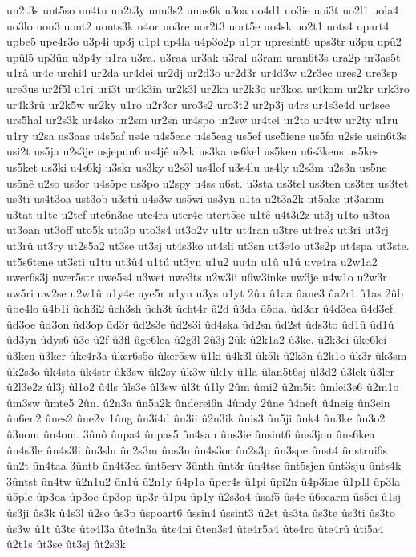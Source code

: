 {un2t3s
unt5so
un4tu
un2t3y
unu3s2
unus6k
u3oa
uo4d1
uo3ie
uoi3t
uo2l1
uola4
uo3lo
uon3
uont2
uonts3k
u4or
uo3re
uor2t3
uort5e
uo4sk
uo2t1
uots4
upart4
upbe5
upe4r3o
u3p4i
up3j
u1pl
up4la
u4p3o2p
u1pr
upresint6
ups3tr
u3pu
upû2
upûl5
up3ûn
u3p4y
u1ra
u3ra.
u3raa
ur3ak
u3ral
u3ram
uran6t3s
ura2p
ur3as5t
u1râ
ur4c
urchi4
ur2da
ur4dei
ur2dj
ur2d3o
ur2d3r
ur4d3w
u2r3ec
ures2
ure3sp
ure3us
ur2f5l
u1ri
uri3t
ur4k3in
ur2k3l
ur2kn
ur2k3o
ur3koa
ur4kom
ur2kr
urk3ro
ur4k3rû
ur2k5w
ur2ky
u1ro
u2r3or
uro3s2
uro3t2
ur2p3j
u4rs
ur4s3e4d
ur4see
urs5hal
ur2s3k
ur4sko
ur2sm
ur2sn
ur4spo
ur2sw
ur4tei
ur2to
ur4tw
ur2ty
u1ru
u1ry
u2sa
us3aas
u4s5af
us4e
u4s5eac
u4s5eag
us5ef
use5iene
us5fa
u2sie
usin6t3s
usi2t
us5ja
u2s3je
usjepun6
us4jê
u2sk
us3ka
us6kel
us5ken
u6s3kens
us5kes
us5ket
us3ki
u4s6kj
u3skr
us3ky
u2s3l
us4lof
u3s4lu
us4ly
u2s3m
u2s3n
us5ne
us5nê
u2so
us3or
u4s5pe
us3po
u2spy
u4ss
u6st.
u3sta
us3tel
us3ten
us3ter
us3tet
us3ti
us4t3oa
ust3ob
u3stú
u4s3w
us5wi
us3yn
u1ta
u2t3a2k
ut5ake
ut3amm
u3tat
u1te
u2tef
ute6n3ac
ute4ra
uter4e
utert5se
u1tê
u4t3i2z
ut3j
u1to
u3toa
ut3oan
ut3off
uto5k
uto3p
uto3s4
ut3o2v
u1tr
ut4ran
u3tre
ut4rek
ut3ri
ut3rj
ut3rû
ut3ry
ut2s5a2
ut3se
ut3sj
ut4s3ko
ut4sli
ut3sn
ut3s4o
ut3s2p
ut4spa
ut3ste.
ut5s6tene
ut3sti
u1tu
ut3û4
u1tú
ut3yn
u1u2
uu4n
u1û
u1ú
uve4ra
u2w1a2
uwer6s3j
uwer5str
uwe5s4
u3wet
uwe3ts
u2w3ii
u6w3inke
uw3je
u4w1o
u2w3r
uw5ri
uw2se
u2w1û
u1y4e
uye5r
u1yn
u3ys
u1yt
2ûa
û1aa
ûane3
ûa2r1
û1as
2ûb
ûbe4lo
û4b1i
ûch3i2
ûch3sh
ûch3t
ûcht4r
û2d
û3da
û5da.
ûd3ar
û4d3ea
û4d3ef
ûd3oe
ûd3on
ûd3op
ûd3r
ûd2s3e
ûd2s3i
ûd4ska
ûd2sn
ûd2st
ûds3to
ûd1û
ûd1ú
ûd3yn
ûdys6
û3e
û2f
û3fl
ûge6lea
û2g3l
2û3j
2ûk
û2k1a2
û3ke.
û2k3ei
ûke6lei
û3ken
û3ker
ûke4r3a
ûker6s5o
ûker5sw
û1ki
û4k3l
ûk5li
û2k3n
û2k1o
ûk3r
ûk3sm
ûk2s3o
ûk4sta
ûk4str
ûk3sw
ûk2sy
ûk3w
ûk1y
û1la
ûlan5t6sj
ûl3d2
û3lek
û3ler
û2l3e2z
ûl3j
ûl1o2
û4ls
ûls3e
ûl3sw
ûl3t
û1ly
2ûm
ûmi2
û2m5it
ûmlei3e6
û2m1o
ûm3sw
ûmte5
2ûn.
û2n3a
ûn5a2k
ûnderei6n
4ûndy
2ûne
û4neft
û4neig
ûn3ein
ûn6en2
ûnes2
ûne2v
1ûng
ûn3i4d
ûn3ii
û2n3ik
ûnis3
ûn5ji
ûnk4
ûn3ke
ûn3o2
û3nom
ûn4om.
3ûnô
ûnpa4
ûnpas5
ûn4san
ûns3ie
ûnsint6
ûns3jon
ûns6kea
ûn4s3le
ûn4s3li
ûn3slu
ûn2s3m
ûns3n
ûn4s3or
ûn2s3p
ûn3spe
ûnst4
ûnstrui6s
ûn2t
ûn4taa
3ûntb
ûn4t3ea
ûnt5erv
3ûnth
ûnt3r
ûn4tse
ûnt5sjen
ûnt3sju
ûnts4k
3ûntst
ûn4tw
û2n1u2
ûn1ú
û2n1y
û4p1a
ûper4s
û1pi
ûpi2n
û4p3ine
û1p1l
ûp3la
û5ple
ûp3oa
ûp3oe
ûp3op
ûp3r
û1pu
ûp1y
û2s3a4
ûsaf5
ûs4e
û6searm
ûs5ei
û1sj
ûs3ji
ûs3k
û4s3l
û2so
ûs3p
ûspoart6
ûssin4
ûssint3
û2st
ûs3ta
ûs3te
ûs3ti
ûs3to
ûs3w
û1t
û3te
ûte4l3a
ûte4n3a
ûte4ni
ûten3s4
ûte4r5a4
ûte4ro
ûte4rû
ûti5a4
û2t1s
ût3se
ût3sj
ût2s3k
}
